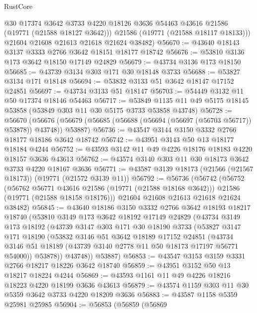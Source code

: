 \begin{lexlean}{RustCore}
\begin{coremodule}
          @30
          @17374
          @3642
          @3733
          @4220
          @18126
          @3636
          @54463
          @43616
          @21586
          (@19771 (@21588 @18127 @3642)))
        @21586
        (@19771 (@21588 @18117 @18133)))
      @21604
      @21608
      @21613
      @21618
      @21624
      @38482)
@56670 := @43640 @18143 @3137 @3333 @2766 @3642 @18151 @18177 @18742
@56676 := @53810 @3136 @173 @3642 @18150 @17149 @24829
@56679 := @43734 @3136 @173 @18150
@56685 := @43739 @3134 @303 @171 @30 @18148 @3733
@56688 := @53827 @3134 @171 @18148
@56694 := @53832 @3133 @51 @3642 @18147 @17152 @24851
@56697 := @43734 @3133 @51 @18147
@56703 := @54449 @3132 @11 @50 @17374 @18146 @54463
@56717 := @53849 @1135 @11 @49 @5175 @18145 @53858 (@53849 @303 @11 @30 @5175 @3733 @53858 @43748)
@56728 := @56670
    (@56676 (@56679 (@56685 (@56688 (@56694 (@56697 (@56703 @56717)) @53878)) @43748)) @53887)
@56736 := @43547 @3144 @3150 @3332 @2766 @18177 @18186 @3642 @18742
@56742 := @43951 @3143 @50 @13 @18177 @18184 @4244
@56752 := @43593 @3142 @11 @49 @4226 @18176 @18183 @4220 @18157 @3636 @43613
@56762 := @43574 @3140 @303 @11 @30 @18173 @3642 @3733 @4220 @18167 @3636
@56771 := @43587 @3139 @18173 (@21566 (@21567 @18173)) (@19771 (@21572 @3139 @11))
@56792 := @56736
    (@56742
      (@56752
        (@56762 @56771 @43616 @21586 (@19771 (@21588 @18168 @3642)))
        @21586
        (@19771 (@21588 @18158 @18176)))
      @21604
      @21608
      @21613
      @21618
      @21624
      @38482)
@56845 := @43640
    @18186
    @3150
    @3332
    @2766
    @3642
    @18193
    @18217
    @18740
    (@53810
      @3149
      @173
      @3642
      @18192
      @17149
      @24829
      (@43734
        @3149
        @173
        @18192
        (@43739
          @3147
          @303
          @171
          @30
          @18190
          @3733
          (@53827
            @3147
            @171
            @18190
            (@53832
              @3146
              @51
              @3642
              @18189
              @17152
              @24851
              (@43734 @3146 @51 @18189 (@43739 @3140 @2778 @11 @50 @18173 @17197 @56771 @54000))
              @53878))
          @43748))
      @53887)
@56853 := @43547 @3153 @3159 @3331 @2766 @18217 @18226 @3642 @18740
@56859 := @43951 @3152 @50 @13 @18217 @18224 @4244
@56869 := @43593 @1161 @11 @49 @4226 @18216 @18223 @4220 @18199 @3636 @43613
@56879 := @43574 @1159 @303 @11 @30 @5359 @3642 @3733 @4220 @18209 @3636
@56883 := @43587 @1158 @5359 @25981 @25985
@56904 := @56853
    (@56859
      (@56869

\end{coremodule}
\end{lexlean}
